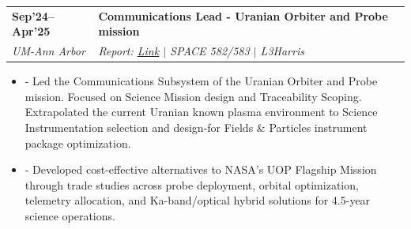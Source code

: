 \documentclass[letterpaper,11pt]{article}
\makeatletter
\newcommand{\resumeItem}[1]{
\item\small{#1}
}
\newcommand{\resumeSubItem}[2]{
  \begin{itemize}[label={}, leftmargin=*]
    \item\small{\hspace{11pt} \textbf{#1} #2}
  \end{itemize}
}
\newlength{\leftcolwidth}
\newlength{\colgap}
\newlength{\rightcolindent}
\newcommand{\resumeSubheading}[4]{%
  \vspace{0pt}
\item[]
  \begin{tabularx}{\textwidth}{@{}>{\raggedleft\arraybackslash}p{\leftcolwidth}@{\hspace{\colgap}}>{\raggedright\arraybackslash}X@{}}
    \textbf{\small #2} & \textbf{#1} \\
    \textit{\small #4} & \textit{\small #3} \\
  \end{tabularx}\vspace{0pt}
}
\newcommand{\resumeItemListStart}{%
  \begin{itemize}[leftmargin=\rightcolindent, label={}, itemindent=0pt,
    itemsep=0.6mm, parsep=0pt, topsep=1pt, partopsep=0pt]}
\renewcommand{\resumeItem}[1]{
  \item\small{#1}}
\newcommand{\resumeItemListEnd}{
  \end{itemize}}
\makeatother
\begin{document}
\resumeSubheading
{Communications Lead - Uranian Orbiter and Probe mission}{Sep'24--Apr'25}
{Report: \href{https://drive.google.com/file/d/1e4JlWVszDD1RgXqv2ruHCZQhk0sHbQ00/view?usp=sharing}{\underline{Link}} $|$ SPACE 582/583 $|$ L3Harris}{UM-Ann Arbor}
\resumeItemListStart
\resumeItem{- Led the Communications Subsystem of the Uranian Orbiter and Probe mission. Focused on Science Mission design and Traceability Scoping. Extrapolated the current Uranian known plasma environment to Science Instrumentation selection and design-for Fields \& Particles instrument package optimization.}
\resumeItem{- Developed cost-effective alternatives to NASA's UOP Flagship Mission through trade studies across probe deployment, orbital optimization, telemetry allocation, and Ka-band/optical hybrid solutions for 4.5-year science operations.}
\resumeItemListEnd
\end{document}
